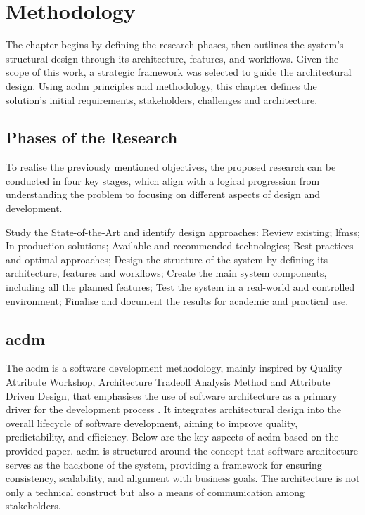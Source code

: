 \chapter{Methodology}
\label{chapter:methodology}

The chapter begins by defining the research phases, then outlines the system's structural design through its architecture, features, and workflows. Given the scope of this work, a strategic framework was selected to guide the architectural design. Using \ac{acdm} principles and methodology, this chapter defines the solution's initial requirements, stakeholders, challenges and architecture.


\section{Phases of the Research} \label{section:phases_of_the_research}

To realise the previously mentioned objectives, the proposed research can be conducted in four key stages, which align with a logical progression from understanding the problem to focusing on different aspects of design and development.

\begin{outline}[enumerate]
    \1 Study the State-of-the-Art and identify design approaches:
        \2 Review existing;
        \2 \aclp{lfms};
        \2 In-production solutions;
        \2 Available and recommended technologies;
        \2 Best practices and optimal approaches;
    \1 Design the structure of the system by defining its architecture, features and workflows;
    \1 Create the main system components, including all the planned features;
    \1 Test the system in a real-world and controlled environment;
    \1 Finalise and document the results for academic and practical use.
\end{outline}


\section{\acl{acdm}} \label{section:acdm}

The \ac{acdm} is a software development methodology, mainly inspired by Quality Attribute Workshop, Architecture Tradeoff Analysis Method and Attribute Driven Design, that emphasises the use of software architecture as a primary driver for the development process \cite{Lattanze2005}. It integrates architectural design into the overall lifecycle of software development, aiming to improve quality, predictability, and efficiency. Below are the key aspects of \ac{acdm} based on the provided paper. \ac{acdm} is structured around the concept that software architecture serves as the backbone of the system, providing a framework for ensuring consistency, scalability, and alignment with business goals. The architecture is not only a technical construct but also a means of communication among stakeholders.

